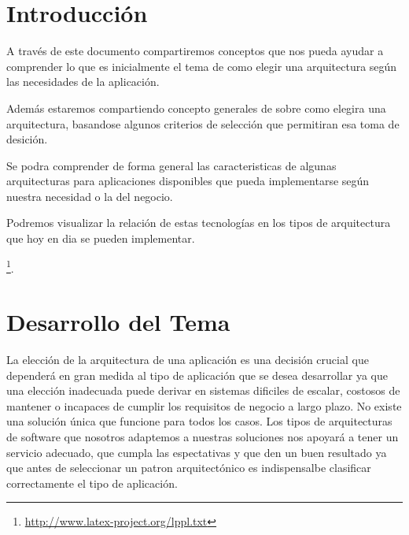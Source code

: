 \documentclass[
	article,			%
	11pt,				%
	oneside,			%
	a4paper,			%
	english,			%
	brazil,				%
	sumario=tradicional
	]{abntex2}
\begin{document}
\section*{Introducción}

A través de este documento compartiremos conceptos que nos pueda ayudar a comprender lo que es inicialmente el tema de como elegir una arquitectura según las necesidades de la aplicación.

Además estaremos compartiendo concepto generales de sobre como elegira una arquitectura, basandose algunos criterios de selección que permitiran esa toma de desición.

Se podra comprender de forma general las caracteristicas de algunas arquitecturas para aplicaciones disponibles que pueda implementarse según nuestra necesidad o la del negocio.

Podremos visualizar la relación de estas tecnologías en los tipos de arquitectura que hoy en dia se pueden implementar.

\footnote{\url{http://www.latex-project.org/lppl.txt}}.


\section{Desarrollo del Tema}
La elección de la arquitectura de una aplicación es una decisión crucial que dependerá en gran medida al tipo de aplicación que se desea desarrollar ya que una elección inadecuada puede derivar en sistemas dificiles de escalar, costosos de mantener o incapaces de cumplir los requisitos de negocio a largo plazo. No existe una solución única que funcione para todos los casos. Los tipos de arquitecturas de software que nosotros adaptemos a nuestras soluciones nos apoyará a tener un servicio adecuado, que cumpla las espectativas y que den un buen resultado ya que antes de seleccionar un patron arquitectónico es indispensalbe clasificar correctamente el tipo de aplicación.
\end{document}

